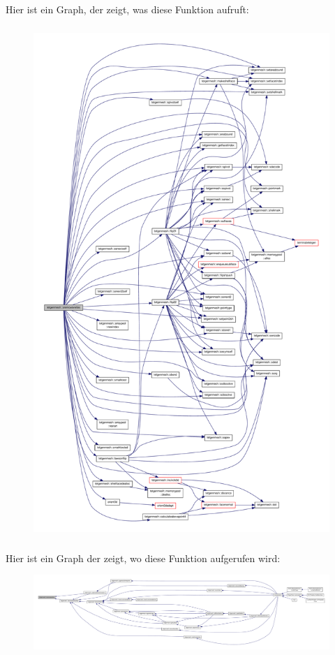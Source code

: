 Hier ist ein Graph, der zeigt, was diese Funktion aufruft\-:\nopagebreak
\begin{figure}[H]
\begin{center}
\leavevmode
\includegraphics[height=550pt]{classtetgenmesh_a7fc2b1bb2e54a5e013edc3e23bd0523b_cgraph}
\end{center}
\end{figure}




Hier ist ein Graph der zeigt, wo diese Funktion aufgerufen wird\-:\nopagebreak
\begin{figure}[H]
\begin{center}
\leavevmode
\includegraphics[width=350pt]{classtetgenmesh_a7fc2b1bb2e54a5e013edc3e23bd0523b_icgraph}
\end{center}
\end{figure}


